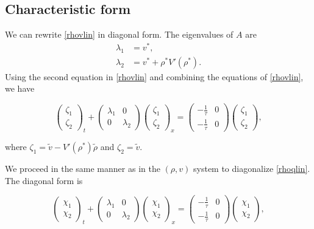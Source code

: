 \documentclass[review]{elsarticle}
\begin{document}
\subsection{Characteristic form}
We can rewrite \eqref{rhovlin} in diagonal form. The eigenvalues of $A$ are 
\begin{align}
\lambda_1 &= v^*, \\
\lambda_2 &= v^* + \rho^* V'( \rho^*).
\end{align}
Using the second equation in \eqref{rhovlin} and combining the equations of \eqref{rhovlin}, we have

\begin{equation}
\begin{pmatrix}
\zeta_1 \\ \zeta_2
\end{pmatrix}_t
+ \begin{pmatrix}
\lambda_1 & 0 \\
0 & \lambda_2 
\end{pmatrix}
\begin{pmatrix}
\zeta_1 \\ \zeta_2
\end{pmatrix}_x
= \begin{pmatrix}
-\frac{1}{\tau} & 0 \\
-\frac{1}{\tau} & 0
\end{pmatrix}
\begin{pmatrix}
\zeta_1 \\ \zeta_2
\end{pmatrix},
\end{equation}

where $\zeta_1 = \tilde{v} - V'( \rho^* )\tilde{\rho}$ and $\zeta_2 = \tilde{v}$. 

We proceed in the same manner as in the $(\rho, v)$ system to diagonalize \eqref{rhoqlin}. The diagonal form is

\begin{equation} \label{rhoqlindiag}
\begin{pmatrix}
\chi_1 \\ \chi_2
\end{pmatrix}_t 
+ \begin{pmatrix}
\lambda_1 & 0 \\
0 & \lambda_2
\end{pmatrix}
\begin{pmatrix}
\chi_1 \\ \chi_2
\end{pmatrix}_x
= \begin{pmatrix}
-\frac{1}{\tau} & 0 \\
-\frac{1}{\tau} & 0
\end{pmatrix}
\begin{pmatrix}
\chi_1 \\ \chi_2
\end{pmatrix},
\end{equation}
\end{document}
